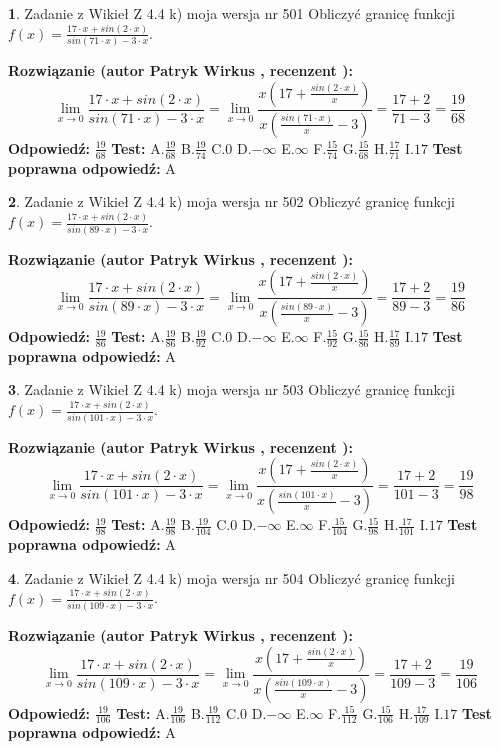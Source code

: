 \documentclass[12pt, a4paper]{article}
\theoremstyle{definition} %
\newtheorem{zad}{}
\newcommand{\zadStart}[1]{\begin{zad}#1\newline}
\newcommand{\zadStop}{\end{zad}}
\newcommand{\rozwStart}[2]{\noindent \textbf{Rozwiązanie (autor #1 , recenzent #2): }\newline}
\newcommand{\rozwStop}{\newline}
\newcommand{\odpStart}{\noindent \textbf{Odpowiedź:}\newline}
\newcommand{\odpStop}{\newline}
\newcommand{\testStart}{\noindent \textbf{Test:}\newline}
\newcommand{\testStop}{\newline}
\newcommand{\kluczStart}{\noindent \textbf{Test poprawna odpowiedź:}\newline}
\newcommand{\kluczStop}{\newline}
\begin{document}
\zadStart{Zadanie z Wikieł Z 4.4 k) moja wersja nr 501}
Obliczyć granicę funkcji $f(x)=\frac{17\cdot x +sin(2\cdot x)}{sin(71\cdot x) -3\cdot x}$.
\zadStop
\rozwStart{Patryk Wirkus}{}
$$\lim\limits_{x\to 0}\frac{17\cdot x +sin(2\cdot x)}{sin(71\cdot x) -3\cdot x}
=\lim\limits_{x\to 0}\frac{x(17+\frac{sin(2\cdot x)}{x})}{x(\frac{sin(71\cdot x)}{x}-3)}
=\frac{17+2}{71-3} = \frac{19}{68}$$
\rozwStop
\odpStart
$\frac{19}{68}$
\odpStop
\testStart
A.$\frac{19}{68}$
B.$\frac{19}{74}$
C.$0$
D.$-\infty$
E.$\infty$
F.$\frac{15}{74}$
G.$\frac{15}{68}$
H.$\frac{17}{71}$
I.$17$
\testStop
\kluczStart
A
\kluczStop



\zadStart{Zadanie z Wikieł Z 4.4 k) moja wersja nr 502}
Obliczyć granicę funkcji $f(x)=\frac{17\cdot x +sin(2\cdot x)}{sin(89\cdot x) -3\cdot x}$.
\zadStop
\rozwStart{Patryk Wirkus}{}
$$\lim\limits_{x\to 0}\frac{17\cdot x +sin(2\cdot x)}{sin(89\cdot x) -3\cdot x}
=\lim\limits_{x\to 0}\frac{x(17+\frac{sin(2\cdot x)}{x})}{x(\frac{sin(89\cdot x)}{x}-3)}
=\frac{17+2}{89-3} = \frac{19}{86}$$
\rozwStop
\odpStart
$\frac{19}{86}$
\odpStop
\testStart
A.$\frac{19}{86}$
B.$\frac{19}{92}$
C.$0$
D.$-\infty$
E.$\infty$
F.$\frac{15}{92}$
G.$\frac{15}{86}$
H.$\frac{17}{89}$
I.$17$
\testStop
\kluczStart
A
\kluczStop



\zadStart{Zadanie z Wikieł Z 4.4 k) moja wersja nr 503}
Obliczyć granicę funkcji $f(x)=\frac{17\cdot x +sin(2\cdot x)}{sin(101\cdot x) -3\cdot x}$.
\zadStop
\rozwStart{Patryk Wirkus}{}
$$\lim\limits_{x\to 0}\frac{17\cdot x +sin(2\cdot x)}{sin(101\cdot x) -3\cdot x}
=\lim\limits_{x\to 0}\frac{x(17+\frac{sin(2\cdot x)}{x})}{x(\frac{sin(101\cdot x)}{x}-3)}
=\frac{17+2}{101-3} = \frac{19}{98}$$
\rozwStop
\odpStart
$\frac{19}{98}$
\odpStop
\testStart
A.$\frac{19}{98}$
B.$\frac{19}{104}$
C.$0$
D.$-\infty$
E.$\infty$
F.$\frac{15}{104}$
G.$\frac{15}{98}$
H.$\frac{17}{101}$
I.$17$
\testStop
\kluczStart
A
\kluczStop



\zadStart{Zadanie z Wikieł Z 4.4 k) moja wersja nr 504}
Obliczyć granicę funkcji $f(x)=\frac{17\cdot x +sin(2\cdot x)}{sin(109\cdot x) -3\cdot x}$.
\zadStop
\rozwStart{Patryk Wirkus}{}
$$\lim\limits_{x\to 0}\frac{17\cdot x +sin(2\cdot x)}{sin(109\cdot x) -3\cdot x}
=\lim\limits_{x\to 0}\frac{x(17+\frac{sin(2\cdot x)}{x})}{x(\frac{sin(109\cdot x)}{x}-3)}
=\frac{17+2}{109-3} = \frac{19}{106}$$
\rozwStop
\odpStart
$\frac{19}{106}$
\odpStop
\testStart
A.$\frac{19}{106}$
B.$\frac{19}{112}$
C.$0$
D.$-\infty$
E.$\infty$
F.$\frac{15}{112}$
G.$\frac{15}{106}$
H.$\frac{17}{109}$
I.$17$
\testStop
\kluczStart
A
\kluczStop
\end{document}
